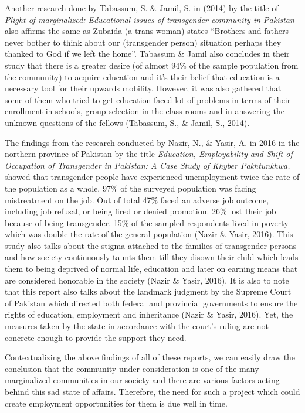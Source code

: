 Another research done by Tabassum, S. \& Jamil, S. in (2014) by the title of \textit {Plight of marginalized: Educational issues of transgender community in Pakistan} also affirms the same as Zubaida (a trans woman) states “Brothers and fathers never bother to think about our (transgender person) situation perhaps they thanked to God if we left the home”. Tabassum \& Jamil also concludes in their study that there is a greater desire (of almost 94\% of the sample population from the community) to acquire education and it's their belief that education is a necessary tool for their upwards mobility. However, it was also gathered that some of them who tried to get education faced lot of problems in terms of their enrollment in schools, group selection in the class rooms and in answering the unknown questions of the fellows (Tabassum, S., \& Jamil, S., 2014). 

The findings from the research conducted by Nazir, N., \& Yasir, A. in 2016 in the northern province of Pakistan by the title \textit {Education, Employability and Shift of Occupation of Transgender in Pakistan: A Case Study of Khyber Pakhtunkhwa.} showed that transgender people have experienced unemployment twice the rate of the population as a whole. 97\% of the surveyed population was facing mistreatment on the job. Out of total 47\% faced an adverse job outcome, including job refusal, or being fired or denied promotion. 26\% lost their job because of being transgender. 15\% of the sampled respondents lived in poverty which was double the rate of the general population (Nazir \& Yasir, 2016). This study also talks about the stigma attached to the families of transgender persons and how society continuously taunts them till they disown their child which leads them to being deprived of normal life, education and later on earning means that are considered honorable in the society (Nazir \& Yasir, 2016). It is also to note that this report also talks about the landmark judgment by the Supreme Court of Pakistan which directed both federal and provincial governments to ensure the rights of education, employment and inheritance (Nazir \& Yasir, 2016). Yet, the measures taken by the state in accordance with the court's ruling are not concrete enough to provide the support they need.

Contextualizing the above findings of all of these reports, we can easily draw the conclusion that the community under consideration is one of the many marginalized communities in our society and there are various factors acting behind this sad state of affairs. Therefore, the need for such a project which could create employment opportunities for them is due well in time.

